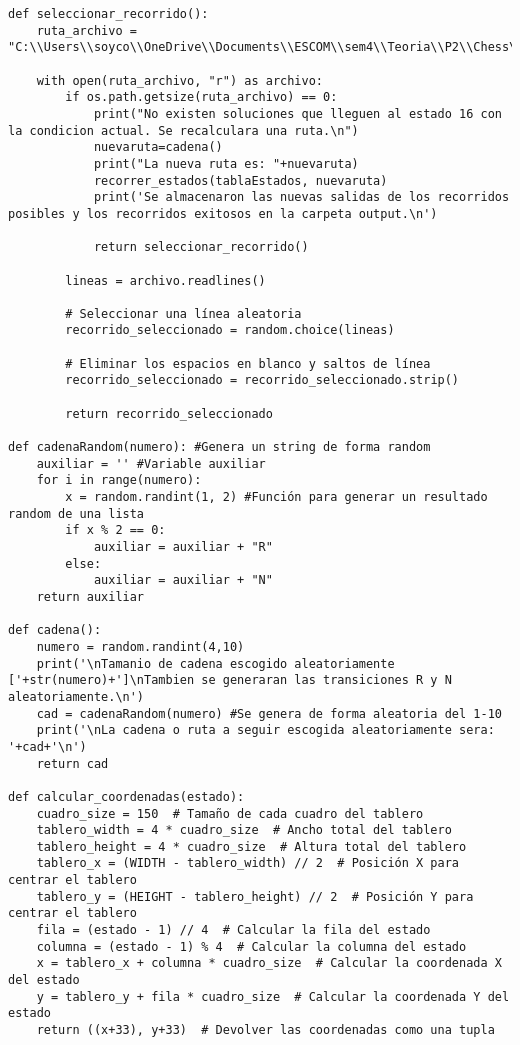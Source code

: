 \begin{enumerate}
\begin{lstlisting}
def seleccionar_recorrido():
    ruta_archivo = "C:\\Users\\soyco\\OneDrive\\Documents\\ESCOM\\sem4\\Teoria\\P2\\Chess\\output\\recorridos_finales.txt"
    
    with open(ruta_archivo, "r") as archivo:
        if os.path.getsize(ruta_archivo) == 0:
            print("No existen soluciones que lleguen al estado 16 con la condicion actual. Se recalculara una ruta.\n")
            nuevaruta=cadena()
            print("La nueva ruta es: "+nuevaruta)
            recorrer_estados(tablaEstados, nuevaruta)
            print('Se almacenaron las nuevas salidas de los recorridos posibles y los recorridos exitosos en la carpeta output.\n')
            
            return seleccionar_recorrido()
            
        lineas = archivo.readlines()
        
        # Seleccionar una línea aleatoria
        recorrido_seleccionado = random.choice(lineas)
        
        # Eliminar los espacios en blanco y saltos de línea
        recorrido_seleccionado = recorrido_seleccionado.strip()
        
        return recorrido_seleccionado

def cadenaRandom(numero): #Genera un string de forma random 
    auxiliar = '' #Variable auxiliar
    for i in range(numero):
        x = random.randint(1, 2) #Función para generar un resultado random de una lista
        if x % 2 == 0:
            auxiliar = auxiliar + "R"
        else:
            auxiliar = auxiliar + "N"
    return auxiliar

def cadena():
    numero = random.randint(4,10)
    print('\nTamanio de cadena escogido aleatoriamente ['+str(numero)+']\nTambien se generaran las transiciones R y N aleatoriamente.\n')
    cad = cadenaRandom(numero) #Se genera de forma aleatoria del 1-10
    print('\nLa cadena o ruta a seguir escogida aleatoriamente sera: '+cad+'\n')
    return cad

def calcular_coordenadas(estado):
    cuadro_size = 150  # Tamaño de cada cuadro del tablero
    tablero_width = 4 * cuadro_size  # Ancho total del tablero
    tablero_height = 4 * cuadro_size  # Altura total del tablero
    tablero_x = (WIDTH - tablero_width) // 2  # Posición X para centrar el tablero
    tablero_y = (HEIGHT - tablero_height) // 2  # Posición Y para centrar el tablero
    fila = (estado - 1) // 4  # Calcular la fila del estado
    columna = (estado - 1) % 4  # Calcular la columna del estado
    x = tablero_x + columna * cuadro_size  # Calcular la coordenada X del estado
    y = tablero_y + fila * cuadro_size  # Calcular la coordenada Y del estado
    return ((x+33), y+33)  # Devolver las coordenadas como una tupla



\end{lstlisting}
\end{enumerate}
